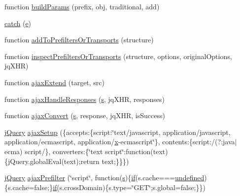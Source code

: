 \begin{DoxyCompactItemize}
\item 
function \hyperlink{obj_2_release_2_package_2_package_tmp_2_scripts_2jquery-1_810_82_8js_a3c4f3b337daa2444fa73ee856be5f9d8}{build\+Params} (prefix, obj, traditional, add)
\item 
\hyperlink{obj_2_release_2_package_2_package_tmp_2_scripts_2jquery-1_810_82_8js_a5bf45fc51bc0426586792b5f9cb95431}{catch} (\hyperlink{_scripts_2respond_8min_8js_a2c038346d47955cbe2cb91e338edd7e1}{e})
\item 
function \hyperlink{obj_2_release_2_package_2_package_tmp_2_scripts_2jquery-1_810_82_8js_ae8bffbac8c6b2208e0ca37b475ec0b70}{add\+To\+Prefilters\+Or\+Transports} (structure)
\item 
function \hyperlink{obj_2_release_2_package_2_package_tmp_2_scripts_2jquery-1_810_82_8js_ac96b244aea80657fe2d6e3d2c1e8b622}{inspect\+Prefilters\+Or\+Transports} (structure, options, original\+Options, jq\+X\+HR)
\item 
function \hyperlink{obj_2_release_2_package_2_package_tmp_2_scripts_2jquery-1_810_82_8js_a113ade43cfd5328ebd5ccc84f45fe4de}{ajax\+Extend} (target, src)
\item 
function \hyperlink{obj_2_release_2_package_2_package_tmp_2_scripts_2jquery-1_810_82_8js_a71c2db7846f21963cee426cb81003c63}{ajax\+Handle\+Responses} (\hyperlink{_scripts_2respond_8min_8js_ad9a7d92cb87932d25187fdec3ba1b621}{s}, jq\+X\+HR, responses)
\item 
function \hyperlink{obj_2_release_2_package_2_package_tmp_2_scripts_2jquery-1_810_82_8js_a549518271b8708165811ae69c274b58a}{ajax\+Convert} (\hyperlink{_scripts_2respond_8min_8js_ad9a7d92cb87932d25187fdec3ba1b621}{s}, response, jq\+X\+HR, is\+Success)
\item 
\hyperlink{_scripts_2jquery-1_810_82_8js_a41c2e1bff4a6b292938143764e31d789}{j\+Query} \hyperlink{obj_2_release_2_package_2_package_tmp_2_scripts_2jquery-1_810_82_8js_a52a40924d02e0d9756f051e36a640cd6}{ajax\+Setup} (\{accepts\+:\{script\+:\char`\"{}text/javascript, application/javascript, application/ecmascript, application/\hyperlink{_scripts_2jquery-1_810_82_8min_8js_a5ce50d751c9664d05375c8f5080ed43e}{x}-\/ecmascript\char`\"{}\}, contents\+:\{script\+:/(?\+:java$\vert$ecma) script/\}, converters\+:\{\char`\"{}text script\char`\"{}\+:function(text)\{j\+Query.\+global\+Eval(text);return text;\}\}\})
\item 
\hyperlink{_scripts_2jquery-1_810_82_8js_a41c2e1bff4a6b292938143764e31d789}{j\+Query} \hyperlink{obj_2_release_2_package_2_package_tmp_2_scripts_2jquery-1_810_82_8js_a144939e373cc1ad511a53c4251ec7ffa}{ajax\+Prefilter} (\char`\"{}script\char`\"{}, function(\hyperlink{_scripts_2respond_8min_8js_ad9a7d92cb87932d25187fdec3ba1b621}{s})\{\hyperlink{_scripts_2respond_8min_8js_a93851d60dd037a83509a1757b9ee7b66}{if}(s.\+cache===\hyperlink{_scripts_2jquery-1_810_82_8js_a08113a236cc18d2a9d5ce27e638012be}{undefined})\{s.\+cache=false;\}\hyperlink{_scripts_2respond_8min_8js_a93851d60dd037a83509a1757b9ee7b66}{if}(s.\+cross\+Domain)\{s.\+type=\char`\"{}G\+ET\char`\"{};s.\+global=false;\}\})

\end{DoxyCompactItemize}
